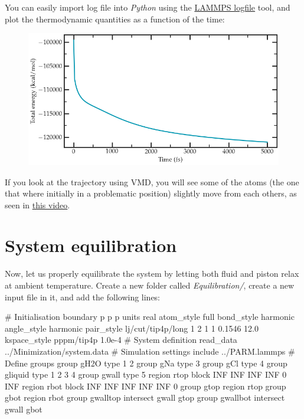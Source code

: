 \noindent You can easily import log file into \textit{Python} using the
\href{https://pypi.org/project/lammps-logfile/}{LAMMPS logfile} tool, and plot the thermodynamic quantities as a function 
of the time:

\begin{figure}
\includegraphics[width=\linewidth]{tutorials/level2/nanosheared-electrolyte/minimization-light.png}
\end{figure}

If you look at the trajectory using VMD, you will see some
of the atoms (the one that where initially in a problematic
position) slightly move from each others, as seen in \href{https://youtu.be/JWGZnFN4TOo}{this video}.

\section{System equilibration}

\noindent Now, let us properly equilibrate the system by letting both
fluid and piston relax at ambient temperature.
Create a new folder called \textit{Equilibration/}, create a new
input file in it, and add the following lines:

\begin{lcverbatim}
# Initialisation
boundary p p p
units real
atom_style full
bond_style harmonic
angle_style harmonic
pair_style lj/cut/tip4p/long 1 2 1 1 0.1546 12.0
kspace_style pppm/tip4p 1.0e-4
# System definition
read_data ../Minimization/system.data
# Simulation settings
include ../PARM.lammps
# Define groups
group gH2O type 1 2
group gNa type 3
group gCl type 4
group gliquid type 1 2 3 4
group gwall type 5
region rtop block INF INF INF INF 0 INF
region rbot block INF INF INF INF INF 0
group gtop region rtop
group gbot region rbot
group gwalltop intersect gwall gtop
group gwallbot intersect gwall gbot
\end{lcverbatim}


